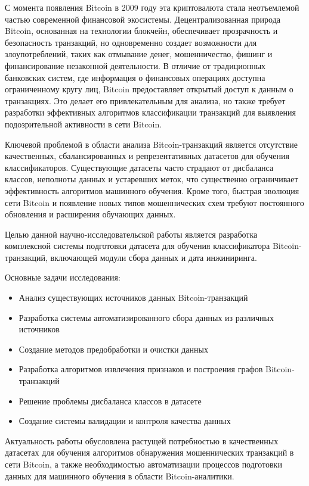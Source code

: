 \introduction %

С момента появления Bitcoin в 2009 году эта криптовалюта стала неотъемлемой частью современной финансовой экосистемы. Децентрализованная природа Bitcoin, основанная на технологии блокчейн, обеспечивает прозрачность и безопасность транзакций, но одновременно создает возможности для злоупотреблений, таких как отмывание денег, мошенничество, фишинг и финансирование незаконной деятельности. В отличие от традиционных банковских систем, где информация о финансовых операциях доступна ограниченному кругу лиц, Bitcoin предоставляет открытый доступ к данным о транзакциях. Это делает его привлекательным для анализа, но также требует разработки эффективных алгоритмов классификации транзакций для выявления подозрительной активности в сети Bitcoin.

Ключевой проблемой в области анализа Bitcoin-транзакций является отсутствие качественных, сбалансированных и репрезентативных датасетов для обучения классификаторов. Существующие датасеты часто страдают от дисбаланса классов, неполноты данных и устаревших меток, что существенно ограничивает эффективность алгоритмов машинного обучения. Кроме того, быстрая эволюция сети Bitcoin и появление новых типов мошеннических схем требуют постоянного обновления и расширения обучающих данных.

Целью данной научно-исследовательской работы является разработка комплексной системы подготовки датасета для обучения классификатора Bitcoin-транзакций, включающей модули сбора данных и дата инжиниринга.

Основные задачи исследования:
\begin{itemize}
    \item Анализ существующих источников данных Bitcoin-транзакций
    \item Разработка системы автоматизированного сбора данных из различных источников
    \item Создание методов предобработки и очистки данных
    \item Разработка алгоритмов извлечения признаков и построения графов Bitcoin-транзакций
    \item Решение проблемы дисбаланса классов в датасете
    \item Создание системы валидации и контроля качества данных
\end{itemize}

Актуальность работы обусловлена растущей потребностью в качественных датасетах для обучения алгоритмов обнаружения мошеннических транзакций в сети Bitcoin, а также необходимостью автоматизации процессов подготовки данных для машинного обучения в области Bitcoin-аналитики.
